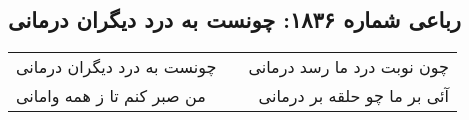 \begin{center}
\section*{رباعی شماره ۱۸۳۶: چونست به درد دیگران درمانی}
\label{sec:1836}
\begin{longtable}{l p{0.5cm} r}
چونست به درد دیگران درمانی
&&
چون نوبت درد ما رسد درمانی
\\
من صبر کنم تا ز همه وامانی
&&
آئی بر ما چو حلقه بر درمانی
\\
\end{longtable}
\end{center}
